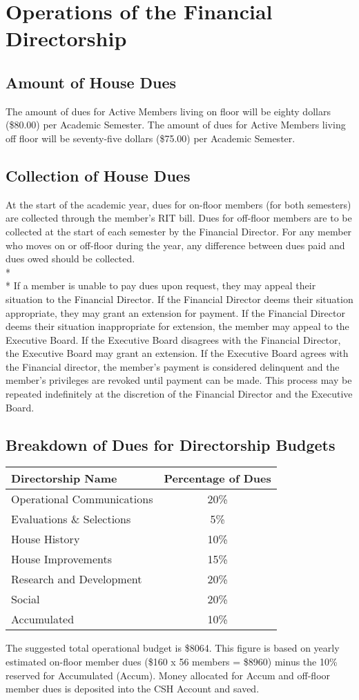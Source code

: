 \documentclass{article}
\newcommand{\bylaw}[1]{\section{#1} \label{#1}}
\newcommand{\bsection}[1]{\subsection{#1} \label{#1}}
\begin{document}
\bylaw{Operations of the Financial Directorship}
\bsection{Amount of House Dues}
The amount of dues for Active Members living on floor will be eighty dollars (\$80.00) per Academic Semester.
The amount of dues for Active Members living off floor will be seventy-five dollars (\$75.00) per Academic Semester.
\bsection{Collection of House Dues}
At the start of the academic year, dues for on-floor members (for both semesters) are collected through the member’s RIT bill.
Dues for off-floor members are to be collected at the start of each semester by the Financial Director.
For any member who moves on or off-floor during the year, any difference between dues paid and dues owed should be collected.
\\*\\*
If a member is unable to pay dues upon request, they may appeal their situation to the Financial Director.
If the Financial Director deems their situation appropriate, they may grant an extension for payment.
If the Financial Director deems their situation inappropriate for extension, the member may appeal to the Executive Board.
If the Executive Board disagrees with the Financial Director, the Executive Board may grant an extension.
If the Executive Board agrees with the Financial director, the member’s payment is considered delinquent and the member’s privileges are revoked until payment can be made.
This process may be repeated indefinitely at the discretion of the Financial Director and the Executive Board.
\bsection{Breakdown of Dues for Directorship Budgets}
\begin{center}
\begin{tabular}[c]{l c}
Directorship Name & Percentage of Dues \\
\hline
\hline
Operational Communications & 20\% \\
\hline
Evaluations \& Selections & 5\% \\
\hline
House History & 10\% \\
\hline
House Improvements & 15\% \\
\hline
Research and Development & 20\% \\
\hline
Social & 20\% \\
\hline
Accumulated & 10\% \\
\hline
\end{tabular}
\end{center}

The suggested total operational budget is \$8064.
This figure is based on yearly estimated on-floor member dues (\$160 x 56 members = \$8960) minus the 10\% reserved for Accumulated (Accum).
Money allocated for Accum and off-floor member dues is deposited into the CSH Account and saved.
\end{document}
